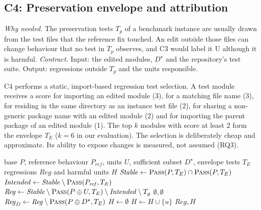 \documentclass[a4paper,fleqn]{cas-sc}
\newcommand{\lab}[1]{\textsf{#1}}
\begin{document}
\subsection{C4: Preservation envelope and attribution}\label{sec:envelope}
\emph{Why needed.} The preservation tests $T_p$ of a benchmark instance are usually drawn from the test files that the reference fix touched. An edit outside those files can change behaviour that no test in $T_p$ observes, and C3 would label it \lab{U} although it is harmful. \emph{Contract.} Input: the edited modules, $D^\star$ and the repository's test suite. Output: regressions outside $T_p$ and the units responsible.

C4 performs a static, import-based regression test selection. A test module receives a score for importing an edited module (3), for a matching file name (3), for residing in the same directory as an instance test file (2), for sharing a non-generic package name with an edited module (2) and for importing the parent package of an edited module (1). The top $k$ modules with score at least 2 form the envelope $T_E$ ($k=6$ in our evaluation). The selection is deliberately cheap and approximate. Its ability to expose changes is measured, not assumed (RQ3).

\begin{algorithm}[t]
\caption{Preservation envelope and attribution (C4)}\label{alg:envelope}
\begin{algorithmic}[1]
\Require base $P$, reference behaviour $P_{\mathit{ref}}$, units $U$, sufficient subset $D^\star$, envelope tests $T_E$
\Ensure regressions $\mathit{Reg}$ and harmful units $H$
\State $\mathit{Stable} \gets \Call{Pass}{P, T_E} \cap \Call{Pass}{P, T_E}$ 
\State $\mathit{Intended} \gets \mathit{Stable}\setminus\Call{Pass}{P_{\mathit{ref}}, T_E}$ 
\State $\mathit{Reg} \gets \mathit{Stable}\setminus\Call{Pass}{P\oplus U, T_E}\setminus\mathit{Intended}\setminus T_g$
 \Return $\emptyset, \emptyset$ \EndIf
\State $\mathit{Reg}_{D} \gets \mathit{Reg}\setminus\Call{Pass}{P\oplus D^\star, T_E}$ 
\State $H \gets \emptyset$
   $H\gets H\cup\{u\}$ \EndIf
\EndFor
\State \Return $\mathit{Reg}, H$
\end{algorithmic}
\end{algorithm}
\end{document}
